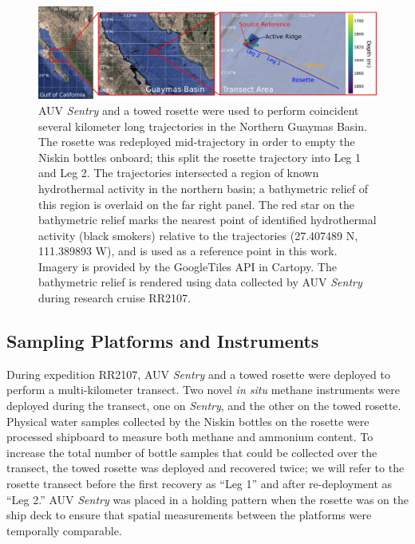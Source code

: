 \begin{figure}[h!]
    \begin{center}
    \includegraphics[width=\columnwidth]{figures/chap3_transect_overview.jpg}
    \end{center}
    \caption[Map of transect experiment extent]{AUV \emph{Sentry} and a towed rosette were used to perform coincident several kilometer long trajectories in the Northern Guaymas Basin. The rosette was redeployed mid-trajectory in order to empty the Niskin bottles onboard; this split the rosette trajectory into Leg 1 and Leg 2. The trajectories intersected a region of known hydrothermal activity in the northern basin; a bathymetric relief of this region is overlaid on the far right panel. The red star on the bathymetric relief marks the nearest point of identified hydrothermal activity (black smokers) relative to the trajectories (27.407489 N, 111.389893 W), and is used as a reference point in this work. Imagery is provided by the GoogleTiles API in Cartopy. The bathymetric relief is rendered using data collected by AUV \emph{Sentry} during research cruise RR2107.}
    \label{fig:bathy}
    \end{figure}


\subsection{Sampling Platforms and Instruments}
During expedition RR2107, AUV \emph{Sentry} and a towed rosette were deployed to perform a multi-kilometer transect. Two novel \emph{in situ} methane instruments were deployed during the transect, one on \emph{Sentry}, and the other on the towed rosette. Physical water samples collected by the Niskin bottles on the rosette were processed shipboard to measure both methane and ammonium content. To increase the total number of bottle samples that could be collected over the transect, the towed rosette was deployed and recovered twice; we will refer to the rosette transect before the first recovery as ``Leg 1'' and after re-deployment as ``Leg 2.'' AUV \emph{Sentry} was placed in a holding pattern when the rosette was on the ship deck to ensure that spatial measurements between the platforms were temporally comparable.

